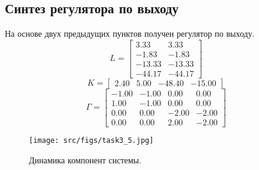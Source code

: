 \subsection{Синтез регулятора по выходу}
На основе двух предыдущих пунктов получен регулятор по выходу.
\[L = \begin{bmatrix}
        3.33 &  3.33\\
       -1.83 & -1.83\\
       -13.33 & -13.33\\
       -44.17 & -44.17
      \end{bmatrix}\]
      \[K = \begin{bmatrix}
        2.40 &  5.00 & -48.40 & -15.00
      \end{bmatrix}\]
      \[\Gamma = \begin{bmatrix}
       -1.00 & -1.00 &  0.00 &  0.00\\
        1.00 & -1.00 &  0.00 &  0.00\\
        0.00 &  0.00 & -2.00 & -2.00\\
        0.00 &  0.00 &  2.00 & -2.00
      \end{bmatrix}\]

      \begin{figure}[ht!]
        \centering
        \texttt{[image: src/figs/task3\_5.jpg]}
        \caption{Динамика компонент системы.}
        \label{fig:task3_5.jpg}
\end{figure}

\FloatBarrier